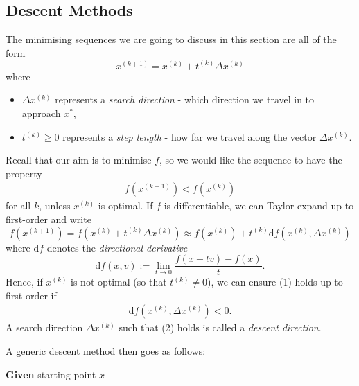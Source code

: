 \documentclass[a4paper,11pt]{article}
\begin{document}
\subsection{Descent Methods}

The minimising sequences we are going to discuss in this section are all of the form $$x^{(k+1)}=x^{(k)}+t^{(k)} \Delta x^{(k)}$$
\vspace{-1mm}where
\begin{itemize}
    \item $\Delta x^{(k)}$ represents a \textit{search direction} - which direction we travel in to approach $x^*$,
    \item $t^{(k)}\geqslant 0$ represents a \textit{step length} - how far we travel along the vector $\Delta x^{(k)}$.
\end{itemize}
Recall that our aim is to minimise $f$, so we would like the sequence to have the property \begin{align}f(x^{(k+1)})<f(x^{(k)})\end{align} for all $k$, unless $x^{(k)}$ is optimal. If $f$ is differentiable, we can Taylor expand up to first-order and write $$f(x^{(k+1)})=f(x^{(k)}+t^{(k)}\Delta x^{(k)})\approx f(x^{(k)})+t^{(k)}\text{d}f(x^{(k)},\Delta x^{(k)})$$ where $\text{d}f$ denotes the \textit{directional derivative} $$\text{d}f(x,v):=\lim_{t\rightarrow 0}\dfrac{f(x+tv)-f(x)}{t}.$$ Hence, if $x^{(k)}$ is not optimal (so that $t^{(k)}\neq 0$), we can ensure (1) holds up to first-order if \begin{align}\text{d}f(x^{(k)},\Delta x^{(k)})<0.\end{align} A search direction $\Delta x^{(k)}$ such that (2) holds is called a \textit{descent direction}. 

\vspace{3mm}A generic descent method then goes as follows:

\vspace{3mm}

\colorbox{blue!10}{\begin{algorithm}[H]\DontPrintSemicolon
 
 \textbf{Given} starting point $x$
 

\end{algorithm}}
\end{document}
